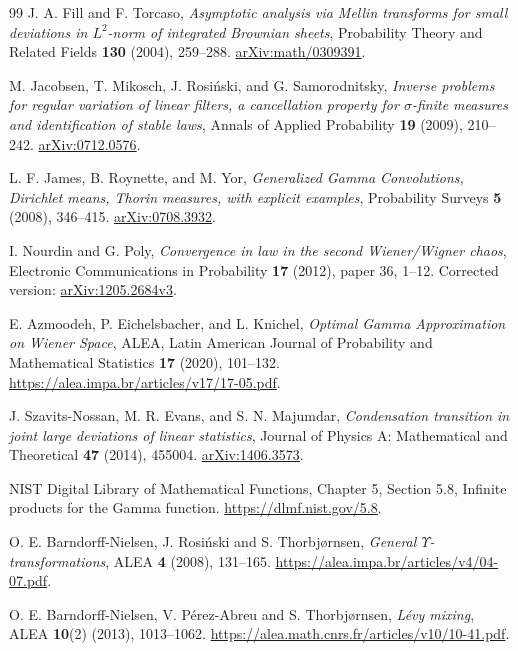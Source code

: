 \documentclass[11pt,letterpaper]{article}
\theoremstyle{definition}
\theoremstyle{remark}
\newcommand{\1}{\mathbf 1}
\begin{document}
\begin{thebibliography}{99}
J. A. Fill and F. Torcaso, \emph{Asymptotic analysis via Mellin
transforms for small deviations in $L^2$-norm of integrated Brownian
sheets}, Probability Theory and Related Fields \textbf{130} (2004),
259--288. \href{https://arxiv.org/abs/math/0309391}{arXiv:math/0309391}.


M. Jacobsen, T. Mikosch, J. Rosi\'nski, and G. Samorodnitsky,
\emph{Inverse problems for regular variation of linear filters, a
cancellation property for $\sigma$-finite measures and identification
of stable laws}, Annals of Applied Probability \textbf{19} (2009),
210--242. \href{https://arxiv.org/abs/0712.0576}{arXiv:0712.0576}.


L. F. James, B. Roynette, and M. Yor, \emph{Generalized Gamma
Convolutions, Dirichlet means, Thorin measures, with explicit examples},
Probability Surveys \textbf{5} (2008), 346--415.
\href{https://arxiv.org/abs/0708.3932}{arXiv:0708.3932}.


I. Nourdin and G. Poly, \emph{Convergence in law in the second
Wiener/Wigner chaos}, Electronic Communications in Probability
\textbf{17} (2012), paper 36, 1--12. Corrected version:
\href{https://arxiv.org/abs/1205.2684v3}{arXiv:1205.2684v3}.


E. Azmoodeh, P. Eichelsbacher, and L. Knichel, \emph{Optimal Gamma
Approximation on Wiener Space}, ALEA, Latin American Journal of
Probability and Mathematical Statistics \textbf{17} (2020), 101--132.
\url{https://alea.impa.br/articles/v17/17-05.pdf}.


J. Szavits-Nossan, M. R. Evans, and S. N. Majumdar,
\emph{Condensation transition in joint large deviations of linear
statistics}, Journal of Physics A: Mathematical and Theoretical
\textbf{47} (2014), 455004.
\href{https://arxiv.org/abs/1406.3573}{arXiv:1406.3573}.


NIST Digital Library of Mathematical Functions, Chapter 5,
Section 5.8, Infinite products for the Gamma function.
\url{https://dlmf.nist.gov/5.8}.


O. E. Barndorff-Nielsen, J. Rosi\'nski and S. Thorbj\o rnsen,
\emph{General $\Upsilon$-transformations}, ALEA \textbf{4} (2008), 131--165.
\url{https://alea.impa.br/articles/v4/04-07.pdf}.


O. E. Barndorff-Nielsen, V. P\'erez-Abreu and S. Thorbj\o rnsen,
\emph{L\'evy mixing}, ALEA \textbf{10}(2) (2013), 1013--1062.
\url{https://alea.math.cnrs.fr/articles/v10/10-41.pdf}.



\end{thebibliography}
\end{document}
